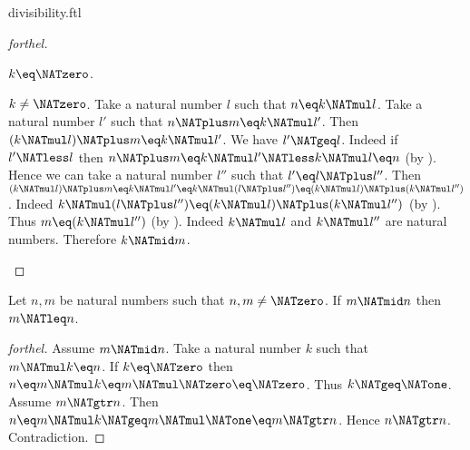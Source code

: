 \documentclass{stex}
\begin{document}
\begin{smodule}{divisibility.ftl}
\begin{proof}[forthel]
  \begin{case}{$k \eq \NATzero$.} \end{case}

  \begin{case}{$k \neq \NATzero$.}
    Take a natural number $l$ such that $n \eq k \NATmul l$.
    Take a natural number $l'$ such that $n \NATplus m \eq k \NATmul l'$.
    Then $(k \NATmul l) \NATplus m \eq k \NATmul l'$.
    We have $l' \NATgeq l$.
    Indeed if $l' \NATless l$ then
    $n \NATplus m
      \eq k \NATmul l'
      \NATless k \NATmul l
      \eq n$ (by ).
    Hence we can take a natural number $l''$ such that $l' \eq l \NATplus l''$.
    Then $(k \NATmul l) \NATplus m
      \eq k \NATmul l'
      \eq k \NATmul (l \NATplus l'')
      \eq (k \NATmul l) \NATplus (k \NATmul l'')$.
    Indeed $k \NATmul (l \NATplus l'') \eq (k \NATmul l) \NATplus (k \NATmul l'')$ (by ).
    Thus $m \eq (k \NATmul l'')$ (by ).
    Indeed $k \NATmul l$ and $k \NATmul l''$ are natural numbers.
    Therefore $k \NATmid m$.
  \end{case}
\end{proof}

\begin{proposition}[forthel,id=ARITHMETIC_07_2187144577679360]
  Let $n, m$ be natural numbers such that $n, m \neq \NATzero$.
  If $m \NATmid n$ then $m \NATleq n$.
\end{proposition}
\begin{proof}[forthel]
  Assume $m \NATmid n$.
  Take a natural number $k$ such that $m \NATmul k \eq n$.
  If $k \eq \NATzero$ then
  $n
    \eq m \NATmul k
    \eq m \NATmul \NATzero
    \eq \NATzero$.
  Thus $k \NATgeq \NATone$.
  Assume $m \NATgtr n$.
  Then $n
    \eq m \NATmul k
    \NATgeq m \NATmul \NATone
    \eq m
    \NATgtr n$.
  Hence $n \NATgtr n$.
  Contradiction.
\end{proof}
\end{smodule}
\end{document}
